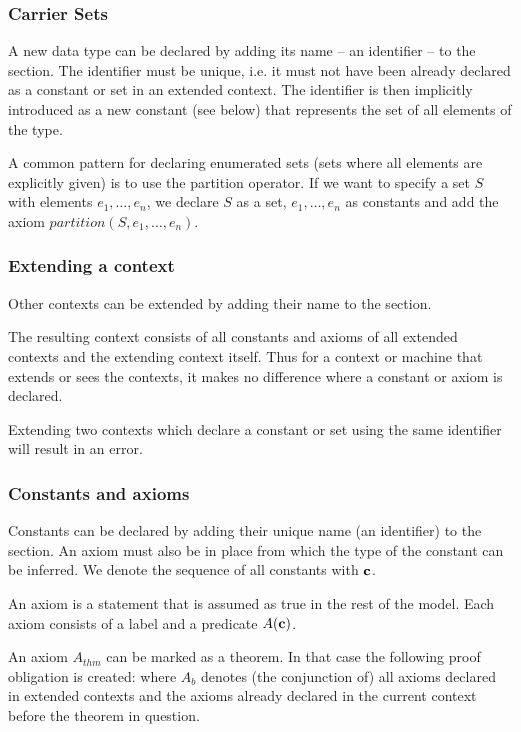 \subsubsection{Carrier Sets}
\label{sets}
A new data type can be declared by adding its name -- an identifier -- to the  section.
The identifier must be unique, i.e. it must not have been already declared as a constant or set in an extended context.
The identifier is then implicitly introduced as a new constant (see below) that represents the set of all elements of the type. 

A common pattern for declaring enumerated sets (sets where all elements are explicitly given)
is to use the partition operator. If we want to specify a set $S$ with elements $e_1,\ldots,e_n$,
we declare $S$ as a set, $e_1,\ldots,e_n$ as constants and add the axiom $partition(S,e_1,\ldots,e_n)$.

\subsubsection{Extending a context}
Other contexts can be extended by adding their name to the  section.

The resulting context consists of all constants and axioms of all extended contexts and the extending context itself.
Thus for a context or machine that extends or sees the contexts, it makes no difference where a constant or axiom is declared.

Extending two contexts which declare a constant or set using the same identifier will result in an error.

\subsubsection{Constants and axioms}
\label{constants_and_axioms}
Constants can be declared by adding their unique name (an identifier) to the  section.
An axiom must also be in place from which the type of the constant can be inferred.
We denote the sequence of all constants with $\mathbf{c}$.

An axiom is a statement that is assumed as true in the rest of the model.
Each axiom consists of a label and a predicate $A(\mathbf{c})$.

An axiom $A_{thm}$ can be marked as a theorem. In that case the following proof obligation is created:
where $A_b$ denotes (the conjunction of) all axioms declared in extended contexts and the axioms already declared in the current context before the theorem in question.

